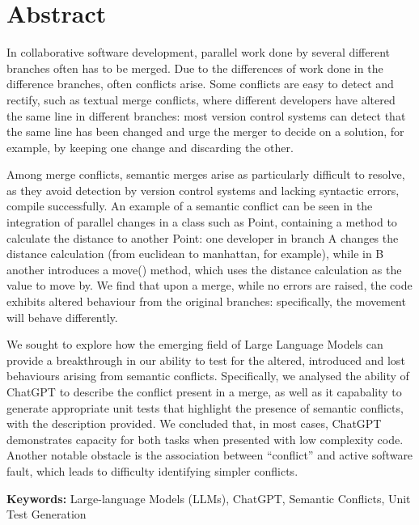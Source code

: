 
\chapter*{Abstract}

In collaborative software development, parallel work done by several different branches often has to be merged. Due to the differences of work done in the difference branches, often conflicts arise. Some conflicts are easy to detect and rectify, such as textual merge conflicts, where different developers have altered the same line in different branches: most version control systems can detect that the same line has been changed and urge the merger to decide on a solution, for example, by keeping one change and discarding the other.

Among merge conflicts, semantic merges arise as particularly difficult to resolve, as they avoid detection by version control systems and lacking syntactic errors, compile successfully.
An example of a semantic conflict can be seen in the integration of parallel changes in a class such as Point, containing a method to calculate the distance to another Point: one developer in branch A changes the distance calculation (from euclidean to manhattan, for example), while in B another introduces a move() method, which uses the distance calculation as the value to move by. We find that upon a merge, while no errors are raised, the code exhibits altered behaviour from the original branches: specifically, the movement will behave differently.

We sought to explore how the emerging field of Large Language Models can provide a breakthrough in our ability to test for the altered, introduced and lost behaviours arising from semantic conflicts. 
Specifically, we analysed the ability of ChatGPT to describe the conflict present in a merge, as well as it capabality to generate appropriate unit tests that highlight the presence of semantic conflicts, with the description provided.
We concluded that, in most cases, ChatGPT demonstrates capacity for both tasks when presented with low complexity code. Another notable obstacle is the association between ``conflict'' and active software fault, which leads to difficulty identifying simpler conflicts.

\bigskip\noindent
\textbf{Keywords:} Large-language Models (LLMs), ChatGPT, Semantic Conflicts, Unit Test Generation
